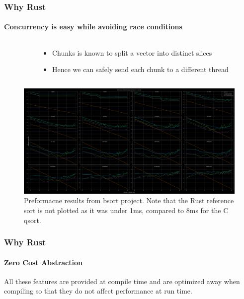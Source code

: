 \documentclass[aspectratio=169]{beamer}
\begin{document}
\begin{frame}
	\frametitle{Why Rust}
	\framesubtitle{Concurrency is easy while avoiding race conditions}
	\begin{columns}
		\begin{column}{ 0.5\textwidth }
			
		\end{column}
		\begin{column}{ 0.4\textwidth }
			\begin{itemize}
				\item Chunks is known to split a vector into distinct slices
				\item Hence we can safely send each chunk to a different thread
			\end{itemize}
		\end{column}
	\end{columns}
\end{frame}

\begin{frame}
	\begin{figure}[ht]
		\centering
		\includegraphics[width=\textwidth]{./figures/project-1-plot.png}
		\caption{Preformacne results from bsort project. Note that the Rust reference sort is not plotted as it was under 1ms, compared to 8ms for the C qsort.}
	\end{figure}
\end{frame}

\begin{frame}
	\frametitle{Why Rust}
	\framesubtitle{Zero Cost Abstraction}

	All these features are provided at compile time and are optimized away when compiling so that they do not affect performance at run time.
\end{frame}
\end{document}
